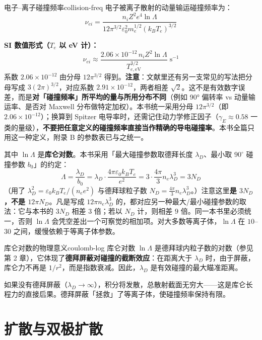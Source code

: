\documentclass[12pt,a4paper,openany,oneside]{book}
\newcommand{\diffmarktext}[1]{%
  \textcolor{coverMid!80}{\rule[-0.1em]{2pt}{0.9em}}\,%
  \textcolor{coverMid}{\footnotesize\textbf{[#1]}}%
}
\newcommand{\difficulty}[1]{\marginnote{\raggedright\diffmarktext{#1}}}
\newcommand{\eps}{\varepsilon}
\begin{document}
\begin{theorem}{电子--离子碰撞频率}{collision-freq}
电子被离子散射的动量输运碰撞频率为：
\[
\nu_{ei} = \frac{n_i Z^2 e^4 \ln\Lambda}{12\pi^{3/2}\eps_0^2 m_e^{1/2}(k_B T_e)^{3/2}}
\]

\textbf{SI 数值形式（$T_e$ 以 eV 计）：}
\[
\nu_{ei} \approx \frac{2.06\times10^{-12}\,n_i Z^2\ln\Lambda}{T_{e,\mathrm{eV}}^{3/2}}\;\mathrm{s^{-1}}
\]
系数 $2.06\times10^{-12}$ 由分母 $12\pi^{3/2}$ 得到。\textbf{注意}：文献里还有另一支常见的写法把分母写成 $3(2\pi)^{3/2}$，对应系数 $2.91\times10^{-12}$，两者相差 $\sqrt2$。这不是有效数字误差，而是\textbf{对「碰撞频率」所平均的量与所用分布不同}（例如 90° 偏转率 vs 动量输运率、是否对 Maxwell 分布做特定加权）。本书统一采用分母 $12\pi^{3/2}$（即 $2.06\times10^{-12}$）；换算到 Spitzer 电导率时，还需记住动力学修正因子（$\gamma_E\approx0.58$ 一类的量级），\textbf{不要把任意定义的碰撞频率直接当作精确的导电碰撞率}。本书全篇只用这一种定义，附录 B 的参数表已与之统一。

其中 $\ln\Lambda$ 是\textbf{库仑对数}。本书采用「最大碰撞参数取德拜长度 $\lambda_D$、最小取 $90^\circ$ 碰撞参数 $b_0$」的约定：
\[
\Lambda = \frac{\lambda_D}{b_0} = \lambda_D\cdot\frac{4\pi\eps_0 k_BT_e}{e^2} = 3\cdot\frac{4\pi}{3}n_e\lambda_D^3 = 3N_D
\]
（用了 $\lambda_D^2=\eps_0k_BT_e/(n_ee^2)$ 与德拜球粒子数 $N_D=\frac{4\pi}{3}n_e\lambda_D^3$。）注意这里\textbf{是 $3N_D$，不是 $12\pi N_D$}。凡是写成 $12\pi n_e\lambda_D^3$ 的，都对应另一种最大/最小碰撞参数的取法：它与本书的 $3N_D$ 相差 $3$ 倍；若以 $N_D$ 计，则相差 $9$ 倍。同一本书里必须统一，否则 $\ln\Lambda$ 会凭空差出一个可察觉的相加项。对大多数等离子体，$\ln\Lambda$ 在 $10$--$30$ 之间，缓慢依赖于等离子体参数。
\end{theorem}

\begin{insight}{库仑对数的物理意义}{coulomb-log}
库仑对数 $\ln\Lambda$ 是德拜球内粒子数的对数（参见第 2 章），它体现了\textbf{德拜屏蔽对碰撞的截断效应}：在距离大于 $\lambda_D$ 时，由于屏蔽，库仑力不再是 $1/r^2$，而是指数衰减。因此，$\lambda_D$ 是有效碰撞的最大瞄准距离。

如果没有德拜屏蔽（$\lambda_D \to \infty$），积分将发散，总散射截面无穷大——这是库仑长程力的直接后果。德拜屏蔽「拯救」了等离子体，使碰撞频率保持有限。
\end{insight}

\section{扩散与双极扩散}\difficulty{基础}
\label{sec:ch8-diffusion}
\end{document}
